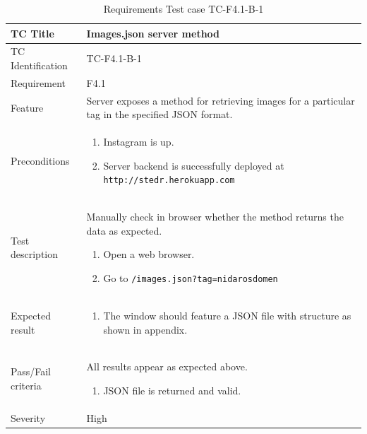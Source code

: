 \documentclass[11pt]{book}
\begin{document}
\begin{table}
  \begin{tabular}{| p{3cm} | p{9.5cm} |} \hline 
    TC Title              & Images.json server method \\ \hline 
    TC Identification     & TC-F4.1-B-1 \\ \hline 
    Requirement           & F4.1 \\ \hline 
    Feature               & Server exposes a method for retrieving images for a particular tag in the specified JSON format. \\ \hline 
    Preconditions         & \begin{enumerate}
                              \item Instagram is up.
                              \item Server backend is successfully deployed at \texttt{http://stedr.herokuapp.com}
                            \end{enumerate} \\ \hline 

    Test description      & Manually check in browser whether the method returns the data as expected.

                            \begin{enumerate}
                              \item Open a web browser.
                              \item Go to \texttt{/images.json?tag=nidarosdomen}
                            \end{enumerate} \\ \hline 
    Expected result       & \begin{enumerate}
                              \item The window should feature a JSON file with structure as shown in appendix. %
                            \end{enumerate} \\ \hline 
    Pass/Fail criteria    & All results appear as expected above.
                            \begin{enumerate}
                              \item JSON file is returned and valid.
                            \end{enumerate} \\ \hline 
    Severity              & High \\ \hline 
  \end{tabular}
  \caption{Requirements Test case TC-F4.1-B-1}
  \label{tab:TCF4.1B1}
\end{table}
\end{document}
